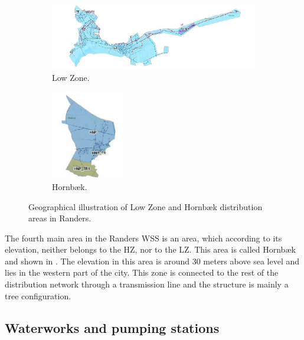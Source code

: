 \begin{figure}[H]
\centering
\begin{subfigure}{.49\textwidth}
\centering
\hspace{3mm}
\includegraphics[width=1.1\textwidth]{report/pictures/Lowzone_region}
\vspace{2mm}
  \caption{Low Zone.}
  \label{fig:lowzone_region}
\end{subfigure}
\begin{subfigure}{.49\textwidth}
\centering
\hspace{3mm}
\includegraphics[width=0.35\textwidth]{report/pictures/Hornbaek_region}
  \caption{Hornbæk.}
  \label{fig:hornbaek_region}
\end{subfigure}
\caption{Geographical illustration of Low Zone and Hornbæk distribution areas in Randers.}
\label{fig:lz_hbp_pic}
\end{figure}
\vspace{-3mm}

The fourth main area in the Randers WSS is an area, which according to its elevation, neither belongs to the HZ, nor to the LZ. This area is called Hornbæk and shown in . The elevation in this area is around 30 meters above sea level and lies in the western part of the city. This zone is connected to the rest of the distribution network through a transmission line and the structure is mainly a tree configuration. 

\subsection{Waterworks and pumping stations}
\label{waterworks_and_pumping_stations}

